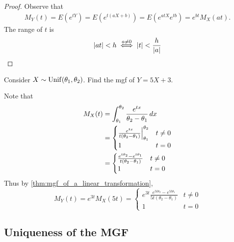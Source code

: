 \documentclass[notoc,notitlepage]{tufte-book}
\begin{document}
\begin{proof}
  Observe that
  \begin{align*}
    M_Y(t) = E(e^{tY}) = E(e^{t(aX + b)}) = E(e^{atX}e^{tb}) = e^{bt} M_X(at).
  \end{align*}
  The range of $t$ is
  \begin{equation*}
    \left|at\right| < h \overset{a \neq 0}{\iff} \left|t\right| < \frac{h}{\left|a\right|}
  \end{equation*}
\end{proof}

\begin{eg}[Example 2.28]
  Consider $X \sim \operatorname{Unif}(\theta_1, \theta_2)$. Find the mgf of $Y = 5X + 3$.

  \begin{solution}
    Note that
    \begin{align*}
      M_X(t) &= \int_{\theta_1}^{\theta_2} \frac{e^{tx}}{\theta_2 - \theta_1} \mathop{}\!d{x} \\
        &= \begin{cases}
          \frac{e^{tx}}{t ( \theta_2 - \theta_1 )} \Big|_{\theta_1}^{\theta_2} & t \neq 0 \\
          1 & t = 0
        \end{cases} \\
        &= \begin{cases}
          \frac{e^{t \theta_2} - e^{t \theta_1}}{t (\theta_2 - \theta_1)} & t \neq 0 \\
          1 & t = 0
        \end{cases}
    \end{align*}
    Thus by \cref{thm:mgf_of_a_linear_transformation},
    \begin{equation*}
      M_Y(t) = e^{3t} M_X(5t) = \begin{cases}
        e^{3t} \frac{e^{5t \theta_2} - e^{5t \theta_1}}{5t (\theta_2 - \theta_1)} & t \neq 0 \\
        1 & t = 0
      \end{cases}
    \end{equation*}
  \end{solution}
\end{eg}


\subsection{Uniqueness of the MGF}
\label{sub:uniqueness_of_the_mgf}
\end{document}
